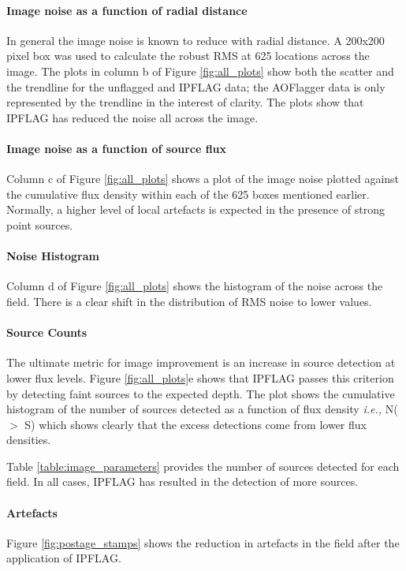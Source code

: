 \documentclass[twocolumn]{aastex61}
\begin{document}
{\noindent
\paragraph{Image noise as a function of radial distance}

In general the image noise is known to reduce with radial distance.  A 200x200
pixel box was used to calculate the robust RMS at 625 locations across the
image. The plots in column b of Figure \ref{fig:all_plots} show both the
scatter and the trendline for the unflagged and IPFLAG data;
the AOFlagger data is only represented by the trendline in the interest of
clarity. The plots show that IPFLAG has reduced the noise all across
the image.

\noindent
\paragraph{Image noise as a function of source flux}
Column c of Figure \ref{fig:all_plots} shows a plot of the image noise
plotted against the cumulative flux density within each of the 625 boxes
mentioned earlier. Normally, a higher level of local artefacts is
expected in the presence of strong point sources.

\noindent
\paragraph{Noise Histogram}

Column d of Figure \ref{fig:all_plots} shows the histogram of the noise
across the field. There is a clear shift in the distribution of RMS noise
to lower values.

\noindent
\paragraph{Source Counts}
The ultimate metric for image improvement is an increase in
source detection at lower flux levels. Figure \ref{fig:all_plots}e shows
that IPFLAG passes this criterion by detecting faint sources to the
expected depth. The plot shows the cumulative histogram of the number
of sources detected as a function of flux density \emph{i.e.,} N($>$ S) which
shows clearly that the excess detections come from lower flux densities.
{Table \ref{table:image_parameters} provides the number of sources
detected for each field. In all cases, IPFLAG has resulted in the detection
of more sources.

\noindent
\paragraph{Artefacts} Figure \ref{fig:postage_stamps} shows the
reduction in artefacts in the field after the application of IPFLAG.

}}
\end{document}
